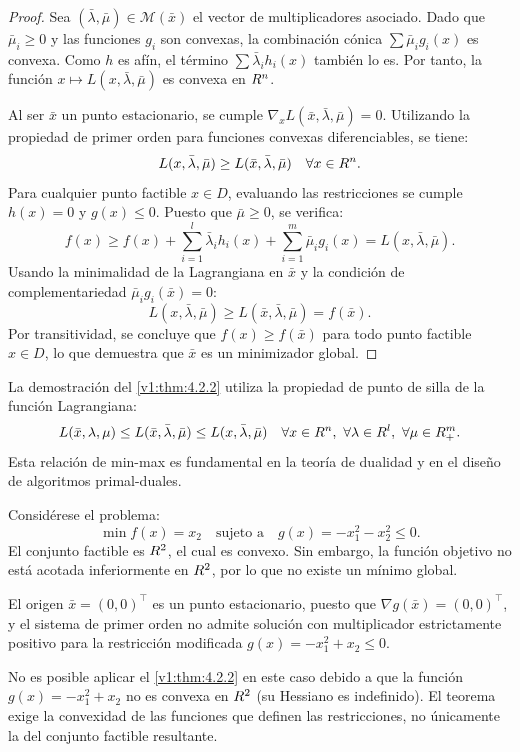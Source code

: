 \begin{proof}
 Sea $(\bar{\lambda}, \bar{\mu}) \in \mathcal{M}(\bar{x})$ el vector de multiplicadores asociado. Dado que $\bar{\mu}_i \ge 0$ y las funciones $g_i$ son convexas, la combinación cónica $\sum \bar{\mu}_i g_i(x)$ es convexa. Como $h$ es afín, el término $\sum \bar{\lambda}_i h_i(x)$ también lo es. Por tanto, la función $x \mapsto L(x, \bar{\lambda}, \bar{\mu})$ es convexa en $R^n$.
 
 Al ser $\bar{x}$ un punto estacionario, se cumple $\nabla_x L(\bar{x}, \bar{\lambda}, \bar{\mu}) = 0$. Utilizando la propiedad de primer orden para funciones convexas diferenciables, se tiene:
 \[
 L(x, \bar{\lambda}, \bar{\mu}) \ge L(\bar{x}, \bar{\lambda}, \bar{\mu}) \quad \forall x \in R^n.
 \]
 Para cualquier punto factible $x \in D$, evaluando las restricciones se cumple $h(x) = 0$ y $g(x) \le 0$. Puesto que $\bar{\mu} \ge 0$, se verifica:
 \[
 f(x) \ge f(x) + \sum_{i=1}^l \bar{\lambda}_i h_i(x) + \sum_{i=1}^m \bar{\mu}_i g_i(x) = L(x, \bar{\lambda}, \bar{\mu}).
 \]
 Usando la minimalidad de la Lagrangiana en $\bar{x}$ y la condición de complementariedad $\bar{\mu}_i g_i(\bar{x}) = 0$:
 \[
 L(x, \bar{\lambda}, \bar{\mu}) \ge L(\bar{x}, \bar{\lambda}, \bar{\mu}) = f(\bar{x}).
 \]
 Por transitividad, se concluye que $f(x) \ge f(\bar{x})$ para todo punto factible $x \in D$, lo que demuestra que $\bar{x}$ es un minimizador global.
\end{proof}

\begin{notabox}
 La demostración del \cref{v1:thm:4.2.2} utiliza la propiedad de punto de silla de la función Lagrangiana:
 \[
 L(\bar{x}, \lambda, \mu) \le L(\bar{x}, \bar{\lambda}, \bar{\mu}) \le L(x, \bar{\lambda}, \bar{\mu}) \quad \forall x \in R^n, \ \forall \lambda \in R^l, \ \forall \mu \in R_+^m.
 \]
 Esta relación de min-max es fundamental en la teoría de dualidad y en el diseño de algoritmos primal-duales.
\end{notabox}

\begin{example}\label{v1:exa:falla_kkt_convexo}
 Considérese el problema:
 \[
 \min f(x) = x_2 \quad \text{sujeto a} \quad g(x) = -x_1^2 - x_2^2 \le 0.
 \]
 El conjunto factible es $R^2$, el cual es convexo. Sin embargo, la función objetivo no está acotada inferiormente en $R^2$, por lo que no existe un mínimo global.
 
 El origen $\bar{x} = (0,0)^\top$ es un punto estacionario, puesto que $\nabla g(\bar{x}) = (0,0)^\top$, y el sistema de primer orden no admite solución con multiplicador estrictamente positivo para la restricción modificada $g(x) = -x_1^2 + x_2 \le 0$.
 
 No es posible aplicar el \cref{v1:thm:4.2.2} en este caso debido a que la función $g(x) = -x_1^2 + x_2$ no es convexa en $R^2$ (su Hessiano es indefinido). El teorema exige la convexidad de las funciones que definen las restricciones, no únicamente la del conjunto factible resultante.
\end{example}

